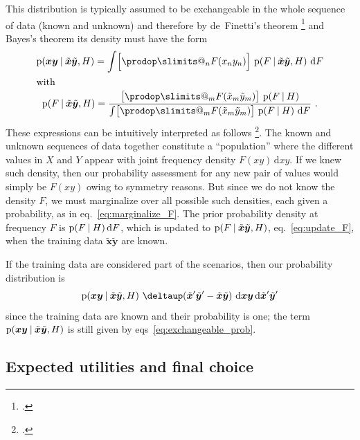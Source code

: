 \documentclass[\ifafour a4paper,12pt,\else a5paper,10pt,\fi%
onecolumn,oneside,article,%
british%
]{memoir}
\makeatletter
\theoremstyle{remark}
\theoremstyle{innote}
\def\prod{\DOTSI\prodop\slimits@}
\newcommand*{\citep}{\footcites}
\newcommand*{\delt}{\deltaup}%
\newcommand*{\di}{\mathrm{d}}%
\newcommand*{\p}{\mathrm{p}}%
\renewcommand*{\|}[1][]{\nonscript\:#1\vert\nonscript\:\mathopen{}}
\newcommand*{\chap}{ch.}%
\newcommand*{\eqn}{eq.}%
\newcommand*{\eqns}{eqs}%
\newcommand*{\cf}{{cf.}}
\newcommand*{\xx}[1]{x_{#1}}
\newcommand*{\yy}[1]{y_{#1}}
\newcommand*{\bz}{\bm{xy}}
\newcommand*{\xxx}[1]{\tilde{x}_{#1}}
\newcommand*{\yyy}[1]{\tilde{y}_{#1}}
\newcommand*{\bzz}{\tilde{\bm{x}}\tilde{\bm{y}}}
\newcommand*{\bzzi}{\tilde{\bm{x}}'\tilde{\bm{y}}'}
\makeatother
\begin{document}
This distribution is typically assumed to be exchangeable in the whole
sequence of data (known and unknown) and therefore by de~Finetti's theorem
\citep{definetti1930,definetti1937,hewittetal1955}[\chap~4]{bernardoetal1994_r2000}[for
an insightful summary see]{dawid2013} and Bayes's theorem its density must
have the form
\begin{subequations} \label{eq:exchangeable_prob}
  \begin{gather}
    \label{eq:marginalize_F}
    \p(\bz \| \bzz, H) =
    \int \Bigl[\prod_{n} F(\xx{n}\yy{n})\Bigr] \ \p(F \| \bzz, H)\ \di F
    \\\shortintertext{with}
    \label{eq:update_F}
    \p(F \| \bzz, H) =
    \frac{
      \bigl[\prod_{m} F(\xxx{m}\yyy{m}) \bigr]\ \p(F \| H)
    }{
      \int \bigl[\prod_{m} F(\xxx{m}\yyy{m}) \bigr]\ \p(F \| H)\ \di F
    } \ .
  \end{gather}
\end{subequations}
These expressions can be intuitively interpreted as follows
\citep[\cf][]{lindleyetal1981}. The known and unknown sequences of data
together constitute a \enquote{population} where the different values in
$X$ and $Y$ appear with joint frequency density $F(xy)\,\di xy$. If we knew
such density, then our probability assessment for any new pair of values
would simply be $F(xy)$ owing to symmetry reasons. But since we do not know
the density $F$, we must marginalize over all possible such densities, each
given a probability, as in \eqn~\eqref{eq:marginalize_F}. The prior
probability density at frequency $F$ is $\p(F \| H)\,\di F$, which is
updated to $\p(F \| \bzz, H)$, \eqn~\eqref{eq:update_F}, when the training
data $\bzz$ are known.

If the training data are considered part of the scenarios, then our
probability distribution is
\begin{equation}
  \label{eq:prob_distr_conditional_withtraining}
  \p(\bz \| \bzz, H)\ \delt(\bzzi-\bzz)\ \di\bz\,\di\bzzi
\end{equation}
since the training data are known and their probability is one; the term
$\p(\bz \| \bzz, H)$ is still given by \eqns~\eqref{eq:exchangeable_prob}.




\subsection{Expected utilities and final choice}
\label{sec:expect_utilities}
\end{document}
